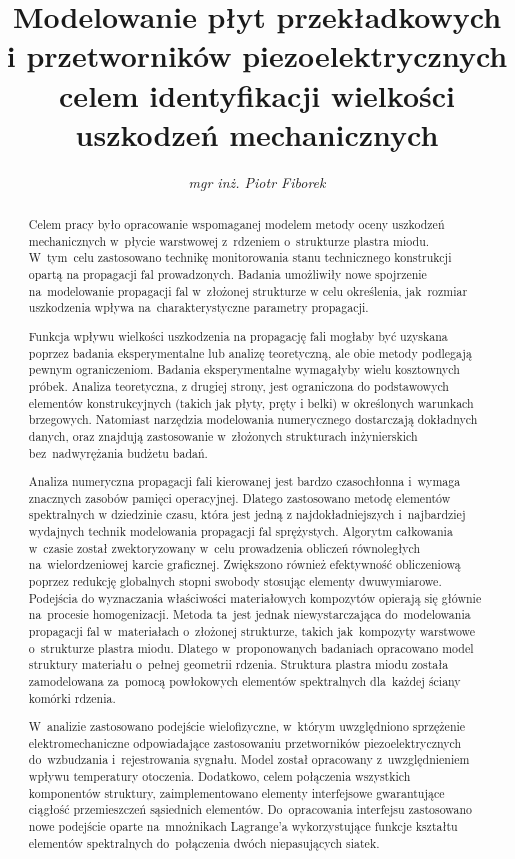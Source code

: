 \documentclass[12pt,a4paper,final]{article}
\title{\textbf{Modelowanie płyt przekładkowych i przetworników piezoelektrycznych celem identyfikacji wielkości uszkodzeń mechanicznych}}
\author{\textit{mgr inż. Piotr Fiborek}\\
		\multicolumn{1}{p{.7\textwidth}}{\centering
			\vspace{0.5cm}
		Instytut Maszyn Przepływowych\\
			im. Roberta Szewlaskiego\\
		Polskiej Akademii Nauk\\
	\vspace{0.5cm}
	Promotor: \textit{dr hab. inż. Pawe\l{} Kudela}\\
			}}
\begin{document}
\maketitle
%
\begin{abstract}

Celem pracy było opracowanie wspomaganej modelem metody oceny uszkodzeń mechanicznych w~płycie warstwowej z~rdzeniem o~strukturze plastra miodu. W~tym~celu zastosowano technikę monitorowania stanu technicznego konstrukcji opartą na propagacji fal prowadzonych. Badania umożliwiły nowe spojrzenie na~modelowanie propagacji fal w~złożonej strukturze w celu określenia, jak~rozmiar uszkodzenia wpływa na~charakterystyczne parametry propagacji.

Funkcja wpływu wielkości uszkodzenia na propagację fali mogłaby być uzyskana poprzez badania eksperymentalne lub analizę teoretyczną, ale obie metody podlegają pewnym ograniczeniom. Badania eksperymentalne wymagałyby wielu kosztownych próbek. Analiza teoretyczna, z drugiej strony, jest ograniczona do podstawowych elementów konstrukcyjnych (takich jak płyty, pręty i belki) w określonych warunkach brzegowych. Natomiast narzędzia modelowania numerycznego dostarczają dokładnych danych, oraz znajdują zastosowanie w~złożonych strukturach inżynierskich bez~nadwyrężania budżetu badań.

Analiza numeryczna propagacji fali kierowanej jest bardzo czasochłonna i~wymaga znacznych zasobów pamięci operacyjnej. Dlatego zastosowano metodę elementów spektralnych w dziedzinie czasu, która jest jedną z najdokładniejszych i~najbardziej wydajnych technik modelowania propagacji fal sprężystych. Algorytm całkowania w~czasie został zwektoryzowany w~celu prowadzenia obliczeń równoległych na~wielordzeniowej karcie graficznej. Zwiększono również efektywność obliczeniową poprzez redukcję globalnych stopni swobody stosując elementy dwuwymiarowe.
Podejścia do wyznaczania właściwości materiałowych kompozytów opierają się głównie na~procesie homogenizacji. Metoda ta~jest jednak niewystarczająca do~modelowania propagacji fal w~materiałach o~złożonej strukturze, takich jak~kompozyty warstwowe o~strukturze plastra miodu. Dlatego w~proponowanych badaniach opracowano model struktury materiału o~pełnej geometrii rdzenia. Struktura plastra miodu została zamodelowana za~pomocą powłokowych elementów spektralnych dla~każdej ściany komórki rdzenia.

W~analizie zastosowano podejście wielofizyczne, w~którym uwzględniono sprzężenie elektromechaniczne odpowiadające zastosowaniu przetworników piezoelektrycznych do~wzbudzania i~rejestrowania sygnału. Model został opracowany z~u\-względnieniem wpływu temperatury otoczenia. Dodatkowo, celem połączenia wszystkich komponentów struktury, zaimplementowano elementy interfejsowe gwarantujące ciągłość przemieszczeń sąsiednich elementów. Do~opracowania interfejsu zastosowano nowe podejście oparte na~mnożnikach Lagrange'a wykorzystujące funkcje kształtu elementów spektralnych do~połączenia dwóch niepasujących siatek.


\end{abstract}
\end{document}
